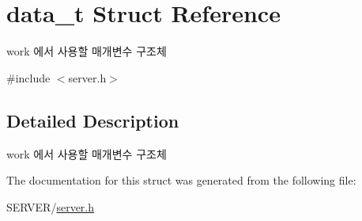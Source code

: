 \hypertarget{structdata__t}{\section{data\-\_\-t Struct Reference}
\label{structdata__t}
}


work 에서 사용할 매개변수 구조체  




{\ttfamily \#include $<$server.\-h$>$}



\subsection{Detailed Description}
work 에서 사용할 매개변수 구조체 

The documentation for this struct was generated from the following file\-:\begin{DoxyCompactItemize}
\item 
S\-E\-R\-V\-E\-R/\hyperlink{server_8h}{server.\-h}\end{DoxyCompactItemize}

